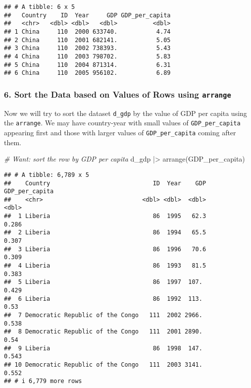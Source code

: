 \documentclass[
]{article}
\newenvironment{Shaded}{\begin{snugshade}}{\end{snugshade}}
\newcommand{\CommentTok}[1]{\textcolor[rgb]{0.56,0.35,0.01}{\textit{#1}}}
\newcommand{\FunctionTok}[1]{\textcolor[rgb]{0.00,0.00,0.00}{#1}}
\newcommand{\NormalTok}[1]{#1}
\newcommand{\SpecialCharTok}[1]{\textcolor[rgb]{0.00,0.00,0.00}{#1}}
\begin{document}
\begin{verbatim}
## # A tibble: 6 x 5
##   Country    ID  Year     GDP GDP_per_capita
##   <chr>   <dbl> <dbl>   <dbl>          <dbl>
## 1 China     110  2000 633740.           4.74
## 2 China     110  2001 682141.           5.05
## 3 China     110  2002 738393.           5.43
## 4 China     110  2003 798702.           5.83
## 5 China     110  2004 871314.           6.31
## 6 China     110  2005 956102.           6.89
\end{verbatim}

\hypertarget{sort-the-data-based-on-values-of-rows-using-arrange}{%
\subsubsection{\texorpdfstring{6. Sort the Data based on Values of Rows
using
\texttt{arrange}}{6. Sort the Data based on Values of Rows using arrange}}\label{sort-the-data-based-on-values-of-rows-using-arrange}}

Now we will try to sort the dataset \texttt{d\_gdp} by the value of GDP
per capita using the \texttt{arrange}. We may have country-year with
small values of \texttt{GDP\_per\_capita} appearing first and those with
larger values of \texttt{GDP\_per\_capita} coming after them.

\begin{Shaded}
\begin{Highlighting}[]
\CommentTok{\# Want: sort the row by GDP per capita}
\NormalTok{d\_gdp }\SpecialCharTok{|\textgreater{}} \FunctionTok{arrange}\NormalTok{(GDP\_per\_capita)}
\end{Highlighting}
\end{Shaded}

\begin{verbatim}
## # A tibble: 6,789 x 5
##    Country                             ID  Year    GDP GDP_per_capita
##    <chr>                            <dbl> <dbl>  <dbl>          <dbl>
##  1 Liberia                             86  1995   62.3          0.286
##  2 Liberia                             86  1994   65.5          0.307
##  3 Liberia                             86  1996   70.6          0.309
##  4 Liberia                             86  1993   81.5          0.383
##  5 Liberia                             86  1997  107.           0.429
##  6 Liberia                             86  1992  113.           0.53 
##  7 Democratic Republic of the Congo   111  2002 2966.           0.538
##  8 Democratic Republic of the Congo   111  2001 2890.           0.54 
##  9 Liberia                             86  1998  147.           0.543
## 10 Democratic Republic of the Congo   111  2003 3141.           0.552
## # i 6,779 more rows
\end{verbatim}
\end{document}
